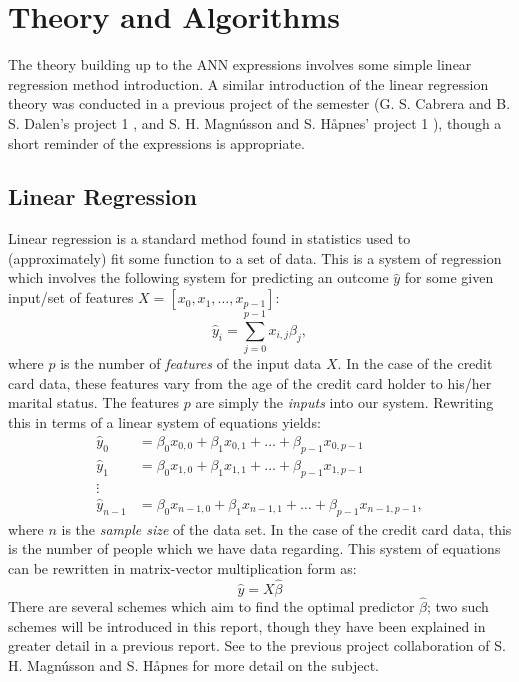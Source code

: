 \section{Theory and Algorithms}
    The theory building up to the ANN expressions involves some simple linear regression method introduction. A similar introduction of the linear regression theory was conducted in a previous project of the semester (G. S. Cabrera and B. S. Dalen's project 1 \cite{4}, and S. H. Magnússon and S. Håpnes' project 1 \cite{5}), though a short reminder of the expressions is appropriate.
    \subsection{Linear Regression}
        Linear regression is a standard method found in statistics used to (approximately) fit some function to a set of data. This is a system of regression which involves the following system for predicting an outcome $\hat{y}$ for some given input/set of features $X=[x_0, x_1, \hdots,  x_{p-1}]$:
        \begin{equation}
            \hat{y}_i = \sum^{p-1}_{j=0} x_{i,j}\beta_j, 
        \end{equation}
        where $p$ is the number of \textit{features} of the input data $X$. In the case of the credit card data, these features vary from the age of the credit card holder to his/her marital status. The features $p$ are simply the \textit{inputs} into our system. Rewriting this in terms of a linear system of equations yields:
        \begin{align*}
            \hat{y}_0 &= \beta_0x_{0,0} + \beta_1x_{0,1} + \hdots +\beta_{p-1}x_{0,p-1}\\
            \hat{y}_1 &= \beta_0x_{1,0} + \beta_1x_{1,1} + \hdots +\beta_{p-1}x_{1,p-1}\\
            \vdots\\
            \hat{y}_{n-1} &= \beta_0x_{n-1,0} + \beta_1x_{n-1,1} + \hdots + \beta_{p-1}x_{n-1,p-1},
        \end{align*}
        where $n$ is the \textit{sample size} of the data set. In the case of the credit card data, this is the number of people which we have data regarding. This system of equations can be rewritten in matrix-vector multiplication form as:
        \begin{equation}
            \hat{y} = X\hat{\beta}
        \end{equation}
        There are several schemes which aim to find the optimal predictor $\hat{\beta}$; two such schemes will be introduced in this report, though they have been explained in greater detail in a previous report. See to the previous project collaboration of S. H. Magnússon and S. Håpnes \cite{5} for more detail on the subject.
